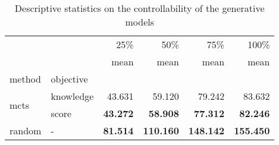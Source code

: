 \begin{table}[!h]
\centering
\caption{Descriptive statistics on the controllability of the generative models}
\label{tab:pcg_controllbility_small}
\begin{tabular}{llrrrr}
\toprule
{} & {} & {25\%} & {50\%} & {75\%} & {100\%} \\
{} & {} & {mean} & {mean} & {mean} & {mean} \\
{method} & {objective} & {} & {} & {} & {} \\
\midrule
\multirow[c]{2}{*}{mcts} & knowledge & 43.631 & 59.120 & 79.242 & 83.632 \\
 & score & \textbf{43.272} & \textbf{58.908} & \textbf{77.312} & \textbf{82.246} \\
random & - & \textbf{81.514} & \textbf{110.160} & \textbf{148.142} & \textbf{155.450} \\
\bottomrule
\end{tabular}
\end{table}